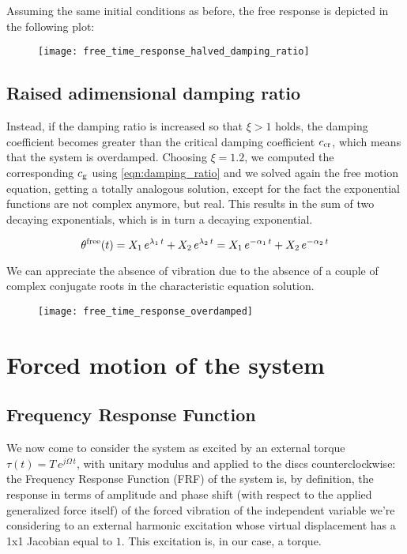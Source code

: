 \documentclass[a4paper,12pt,oneside]{article}
\begin{document}
Assuming the same initial conditions as before, the free response is depicted in the following plot:

\begin{figure}[h]
	\hspace{-70pt}
	\texttt{[image: free\_time\_response\_halved\_damping\_ratio]}
\end{figure}

\clearpage

\subsection{Raised adimensional damping ratio}

Instead, if the damping ratio is increased so that $ \xi > 1 $ holds, the damping coefficient becomes greater than the critical damping coefficient $ c_\textup{cr} $, which means that the system is overdamped. Choosing $ \xi = 1.2 $, we computed the corresponding $ c_\textup{g} $ using \eqref{eqn:damping_ratio} and we solved again the free motion equation, getting a totally analogous solution, except for the fact the exponential functions are not complex anymore, but real. This results in the sum of two decaying exponentials, which is in turn a decaying exponential.

\[
	\theta^\textup{free}(t) = X_1 \, e^{\lambda_1 \, t} + X_2 \, e^{\lambda_2 \, t} =
		X_1 \, e^{-\alpha_1 \, t} + X_2 \, e^{-\alpha_2 \, t}
\]

We can appreciate the absence of vibration due to the absence of a couple of complex conjugate roots in the characteristic equation solution.

\begin{figure}[h]
	\hspace{-70pt}
	\texttt{[image: free\_time\_response\_overdamped]}
\end{figure}

\section{Forced motion of the system}

\subsection{Frequency Response Function}
\label{subs:frf}

We now come to consider the system as excited by an external torque $ \tau(t) = T \, e^{j \Omega \, t} $, with unitary modulus and applied to the discs counterclockwise: the Frequency Response Function (FRF) of the system is, by definition, the response in terms of amplitude and phase shift (with respect to the applied generalized force itself) of the forced vibration of the independent variable we're considering to an external harmonic excitation whose virtual displacement has a 1x1 Jacobian equal to $ 1 $. This excitation is, in our case, a torque.
\end{document}
